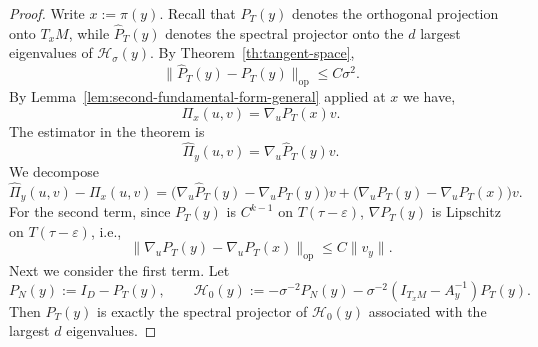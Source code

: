 \documentclass[10pt,a4paper]{amsart}
\begin{document}
\begin{proof}
Write $x:=\pi(y)$. Recall that $P_T(y)$ denotes the orthogonal projection onto $T_xM$, while $\widehat P_T(y)$ denotes the spectral projector onto the $d$ largest eigenvalues of $\mathcal{H}_\sigma(y)$. By Theorem~\ref{th:tangent-space},
\[
\|\widehat P_T(y)-P_T(y)\|_{\mathrm{op}}
\le C\sigma^2.
\] 
By Lemma~\ref{lem:second-fundamental-form-general} applied at $x$ we have,
\[
\Pi_x(u,v) = \nabla_uP_T(x)v.
\]
The estimator in the theorem is
\[
\widehat\Pi_y(u,v)
=
\nabla_u\widehat P_T(y)v.
\]
We decompose
\[
\widehat\Pi_y(u,v)-\Pi_x(u,v)
=
\big(\nabla_u\widehat P_T(y)-\nabla_uP_T(y)\big)v
+
\big(\nabla_uP_T(y)-\nabla_uP_T(x)\big)v.
\]
For the second term, since $P_T(y)$ is $C^{k-1}$ on $T(\tau-\varepsilon)$, $\nabla P_T(y)$ is Lipschitz on $T(\tau-\varepsilon)$, i.e.,
\[
\|\nabla_uP_T(y)-\nabla_uP_T(x)\|_{\mathrm{op}}
\le C\|v_y\|.
\]
Next we consider the first term. Let
\[
P_N(y):=I_D-P_T(y),
\qquad
\mathcal H_0(y):= -\sigma^{-2}P_N(y)-\sigma^{-2}(I_{T_xM}-A_y^{-1})P_T(y).
\]
Then $P_T(y)$ is exactly the spectral projector of $\mathcal H_0(y)$ associated with the largest $d$ eigenvalues.


\end{proof}
\end{document}
